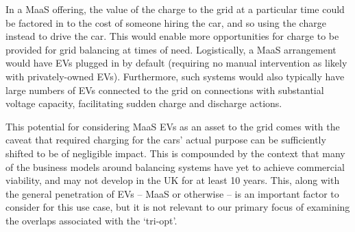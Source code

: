 \documentclass[b5paper,10pt]{article}
\begin{document}
In a MaaS offering, the value of the charge to the grid at a
particular time could be factored in to the cost of someone hiring the
car, and so using the charge instead to drive the car. This would
enable more opportunities for charge to be provided for grid balancing
at times of need. Logistically, a MaaS arrangement would have EVs
plugged in by default (requiring no manual intervention as likely with
privately-owned EVs). Furthermore, such systems would also typically
have large numbers of EVs connected to the grid on connections with
substantial voltage capacity, facilitating sudden charge and discharge
actions.

This potential for considering MaaS EVs as an asset to the grid comes
with the caveat that required charging for the cars' actual purpose
can be sufficiently shifted to be of negligible impact. This is
compounded by the context that many of the business models around
balancing systems have yet to achieve commercial viability, and may
not develop in the UK for at least 10 years. This, along with the
general penetration of EVs -- MaaS or otherwise -- is an important
factor to consider for this use case, but it is not relevant to our
primary focus of examining the overlaps associated with the `tri-opt'.





\end{document}
